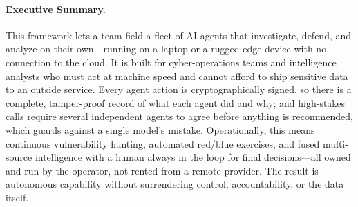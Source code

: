 \documentclass[11pt,letterpaper]{article}
\begin{document}
\makecover

\begin{abstract}
We present an agentic AI framework comprising 83 specialized agents and 15 multi-agent orchestrators for autonomous cyber operations, intelligence fusion, and tactical decision support. The framework operates across three tiers: (1) a Playground control plane providing Kubernetes-like orchestration for autonomous AI agents with W3C DID identity, verifiable credentials, and durable state; (2) an agent SDK with async-first execution, OpenAI-compatible APIs, and native Model Context Protocol (MCP) integration exposing 13 canonical tools; and (3) a ZAP-based consensus protocol enabling distributed agent voting with threshold agreement and post-quantum authentication. Agents execute 200--300 sequential tool calls for deep analysis, coordinate via zero-copy binary RPC at 4.2M calls/second, and operate fully disconnected on edge hardware using quantized Zen models (0.8B--27B parameters). The system supports automated red/blue team operations, vulnerability chain analysis, multi-source intelligence correlation, and course-of-action generation with explainable reasoning via chain-of-thought traces. A multi-channel bot platform unifies 20+ messaging channels under local-first privacy controls for secure operator interaction.
\end{abstract}

\paragraph{Executive Summary.}
This framework lets a team field a fleet of AI agents that investigate, defend, and analyze on their own---running on a laptop or a rugged edge device with no connection to the cloud. It is built for cyber-operations teams and intelligence analysts who must act at machine speed and cannot afford to ship sensitive data to an outside service. Every agent action is cryptographically signed, so there is a complete, tamper-proof record of what each agent did and why; and high-stakes calls require several independent agents to agree before anything is recommended, which guards against a single model's mistake. Operationally, this means continuous vulnerability hunting, automated red/blue exercises, and fused multi-source intelligence with a human always in the loop for final decisions---all owned and run by the operator, not rented from a remote provider. The result is autonomous capability without surrendering control, accountability, or the data itself.
\end{document}
